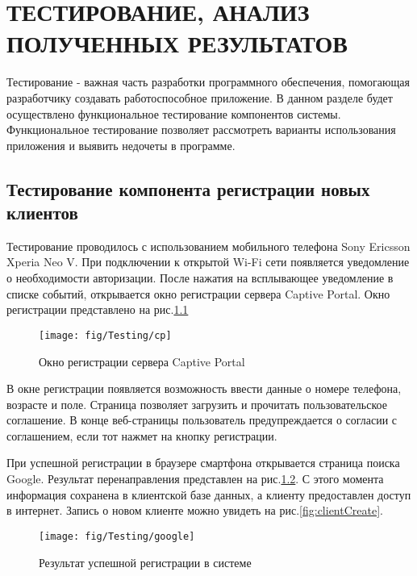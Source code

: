 \chapter{ТЕСТИРОВАНИЕ, АНАЛИЗ ПОЛУЧЕННЫХ РЕЗУЛЬТАТОВ}

Тестирование - важная часть разработки программного обеспечения, помогающая разработчику создавать работоспособное приложение. В данном разделе будет осуществлено функциональное тестирование компонентов системы. Функциональное тестирование позволяет рассмотреть варианты использования приложения и выявить недочеты в программе.

\section{Тестирование компонента регистрации новых клиентов}

Тестирование проводилось с использованием мобильного телефона Sony Ericsson Xperia Neo V.
При подключении к открытой Wi-Fi сети появляется уведомление о необходимости авторизации. После нажатия на всплывающее уведомление в списке событий, открывается окно регистрации сервера Captive Portal. Окно регистрации представлено на рис.\ref{fig:cp}

\begin{figure}[H]
	\centering
	\texttt{[image: fig/Testing/cp]}
	\caption{Окно регистрации сервера Captive Portal}
	\label{fig:cp}
\end{figure}

В окне регистрации появляется возможность ввести данные о номере телефона, возрасте и поле. Страница позволяет загрузить и прочитать пользовательское соглашение. В конце веб-страницы пользователь предупреждается о согласии с соглашением, если тот нажмет на кнопку регистрации. 

При успешной регистрации в браузере смартфона открывается страница поиска Google. Результат перенаправления представлен на рис.\ref{fig:google}. С этого момента информация сохранена в клиентской базе данных, а клиенту предоставлен доступ в интернет. Запись о новом клиенте можно увидеть на рис.\ref{fig:clientCreate}.

\begin{figure}[H]
	\centering
	\texttt{[image: fig/Testing/google]}
	\caption{Результат успешной регистрации в системе}
	\label{fig:google}
\end{figure}

